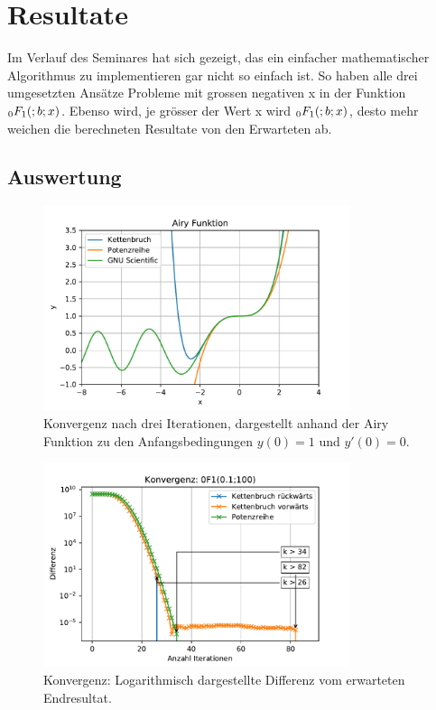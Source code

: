 %
%
%
\section{Resultate
\label{0f1:section:teil3}}
Im Verlauf des Seminares hat sich gezeigt, 
das ein einfacher mathematischer Algorithmus zu implementieren gar nicht so einfach ist.
So haben alle drei umgesetzten Ansätze Probleme mit grossen negativen x in der Funktion $\mathstrut_0F_1(;b;x)$.
Ebenso wird, je grösser der Wert x wird $\mathstrut_0F_1(;b;x)$, desto mehr weichen die berechneten Resultate
von den Erwarteten ab. \cite{0f1:wolfram-0f1}

\subsection{Auswertung
\label{0f1:subsection:auswertung}}
\begin{figure}
    \centering
    \includegraphics[width=0.8\textwidth]{papers/0f1/images/konvergenzAiry.pdf}
    \caption{Konvergenz nach drei Iterationen, dargestellt anhand der Airy Funktion zu den Anfangsbedingungen $y(0)=1$ und $y'(0)=0$.
    \label{0f1:ausblick:plot:airy:konvergenz}}
\end{figure}

\begin{figure}
    \centering
    \includegraphics[width=0.8\textwidth]{papers/0f1/images/konvergenzPositiv.pdf}
    \caption{Konvergenz: Logarithmisch dargestellte Differenz vom erwarteten Endresultat.
    \label{0f1:ausblick:plot:konvergenz:positiv}}
\end{figure}

